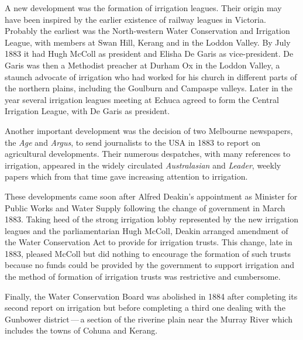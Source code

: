 A new development was the formation of irrigation leag\-ues.  Their
origin may have been inspired by the earlier existence of railway
leag\-ues in Victoria.  Probably the earliest was the North-western
Water Conservation and Irrigation League,  with members at Swan Hill,
 Kerang  and in the Loddon Valley. 
 By July 1883 it had Hugh McColl  as
president and Elisha De Garis  as
vice-president. De Garis was then a Methodist preacher at Durham Ox
 in the Loddon Valley, a staunch advocate of
irrigation who had worked for his church in different parts of the
northern plains, including the Goulburn and Campaspe
valleys.   Later in the
year several irrigation leagues meeting at Echuca 
agreed to form the Central Irrigation League, with De Garis as
president.

Another important development was the decision of two Melbourne
newspapers, the \textit{Age} and \textit{Argus}, to send journalists
to the USA  in 1883 to report on agricultural developments.
Their numerous despatches, with many references to irrigation,
appeared in the widely circulated \textit{Australasian} and
\textit{Leader}, weekly papers which from that time gave increasing
attention to irrigation.

These developments came soon after Alfred Deakin's 
appointment as Minister for Public Works and Water Supply following
the change of government in March 1883.  Taking heed of the strong
irrigation lobby represented by the new irrigation leagues and the
parliamentarian Hugh McColl,  Deakin arranged
amendment of the Water Conservation Act  to provide for irrigation trusts.  This change,
late in 1883, pleased McColl but did nothing to encourage the
formation of such trusts because no funds could be provided by the
government to support irrigation and the method of formation of
irrigation trusts was restrictive and
cumbersome.

Finally, the Water Conservation Board was abolished in 1884 after
completing its second report on irrigation but before completing a
third one dealing with the Gunbower district\,---\,a section of the
riverine plain near the Murray River  which
includes the towns of Cohuna  and   Ke\-rang.

